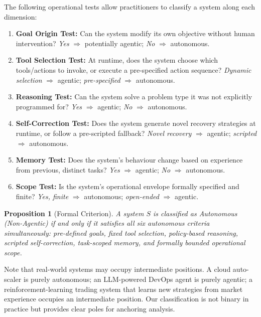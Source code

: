 \documentclass[12pt, a4paper]{article}
\newtheorem{proposition}{Proposition}
\begin{document}
The following operational tests allow practitioners to classify a system along each dimension:

\begin{enumerate}
    \item \textbf{Goal Origin Test:} Can the system modify its own objective without human intervention? \emph{Yes} $\Rightarrow$ potentially agentic; \emph{No} $\Rightarrow$ autonomous.
    \item \textbf{Tool Selection Test:} At runtime, does the system choose which tools/actions to invoke, or execute a pre-specified action sequence? \emph{Dynamic selection} $\Rightarrow$ agentic; \emph{pre-specified} $\Rightarrow$ autonomous.
    \item \textbf{Reasoning Test:} Can the system solve a problem type it was not explicitly programmed for? \emph{Yes} $\Rightarrow$ agentic; \emph{No} $\Rightarrow$ autonomous.
    \item \textbf{Self-Correction Test:} Does the system generate novel recovery strategies at runtime, or follow a pre-scripted fallback? \emph{Novel recovery} $\Rightarrow$ agentic; \emph{scripted} $\Rightarrow$ autonomous.
    \item \textbf{Memory Test:} Does the system's behaviour change based on experience from previous, distinct tasks? \emph{Yes} $\Rightarrow$ agentic; \emph{No} $\Rightarrow$ autonomous.
    \item \textbf{Scope Test:} Is the system's operational envelope formally specified and finite? \emph{Yes, finite} $\Rightarrow$ autonomous; \emph{open-ended} $\Rightarrow$ agentic.
\end{enumerate}

\begin{proposition}[Formal Criterion]
A system $S$ is classified as \emph{Autonomous (Non-Agentic)} if and only if it satisfies all six autonomous criteria simultaneously: pre-defined goals, fixed tool selection, policy-based reasoning, scripted self-correction, task-scoped memory, and formally bounded operational scope.
\end{proposition}

Note that real-world systems may occupy intermediate positions. A cloud auto-scaler is purely autonomous; an LLM-powered DevOps agent is purely agentic; a reinforcement-learning trading system that learns new strategies from market experience occupies an intermediate position. Our classification is not binary in practice but provides clear poles for anchoring analysis.
\end{document}
